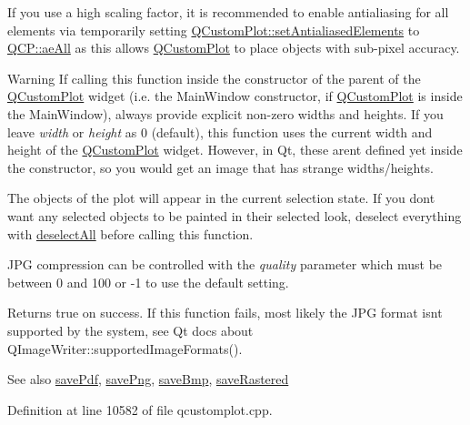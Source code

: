 If you use a high scaling factor, it is recommended to enable antialiasing for all elements via temporarily setting \hyperlink{class_q_custom_plot_af6f91e5eab1be85f67c556e98c3745e8}{Q\+Custom\+Plot\+::set\+Antialiased\+Elements} to \hyperlink{namespace_q_c_p_ae55dbe315d41fe80f29ba88100843a0caa897c232a0ffc8368e7c100ffc59ef31}{Q\+C\+P\+::ae\+All} as this allows \hyperlink{class_q_custom_plot}{Q\+Custom\+Plot} to place objects with sub-\/pixel accuracy.

\begin{DoxyWarning}{Warning}
If calling this function inside the constructor of the parent of the \hyperlink{class_q_custom_plot}{Q\+Custom\+Plot} widget (i.\+e. the Main\+Window constructor, if \hyperlink{class_q_custom_plot}{Q\+Custom\+Plot} is inside the Main\+Window), always provide explicit non-\/zero widths and heights. If you leave {\itshape width} or {\itshape height} as 0 (default), this function uses the current width and height of the \hyperlink{class_q_custom_plot}{Q\+Custom\+Plot} widget. However, in Qt, these aren\textquotesingle{}t defined yet inside the constructor, so you would get an image that has strange widths/heights.
\end{DoxyWarning}
The objects of the plot will appear in the current selection state. If you don\textquotesingle{}t want any selected objects to be painted in their selected look, deselect everything with \hyperlink{class_q_custom_plot_a9d4808ab925b003054085246c92a257c}{deselect\+All} before calling this function.

J\+P\+G compression can be controlled with the {\itshape quality} parameter which must be between 0 and 100 or -\/1 to use the default setting.

Returns true on success. If this function fails, most likely the J\+P\+G format isn\textquotesingle{}t supported by the system, see Qt docs about Q\+Image\+Writer\+::supported\+Image\+Formats().

\begin{DoxySeeAlso}{See also}
\hyperlink{class_q_custom_plot_a632da44c6d94ea8b271eb483b08b5114}{save\+Pdf}, \hyperlink{class_q_custom_plot_a7636261aff1f6d25c9da749ece3fc8b8}{save\+Png}, \hyperlink{class_q_custom_plot_a6629d9e8e6da4bf18055ee0257fdce9a}{save\+Bmp}, \hyperlink{class_q_custom_plot_ab528b84cf92baabe29b1d0ef2f77c93e}{save\+Rastered} 
\end{DoxySeeAlso}


Definition at line 10582 of file qcustomplot.\+cpp.



